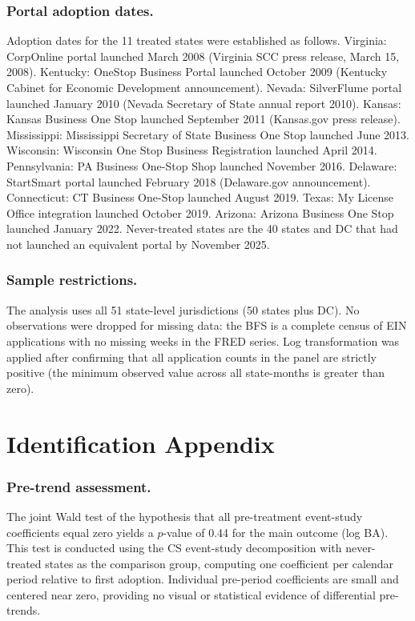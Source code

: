 \documentclass[12pt]{article}
\begin{document}
\subsubsection*{Portal adoption dates.}
Adoption dates for the 11 treated states were established as follows. Virginia: CorpOnline portal launched March 2008 (Virginia SCC press release, March 15, 2008). Kentucky: OneStop Business Portal launched October 2009 (Kentucky Cabinet for Economic Development announcement). Nevada: SilverFlume portal launched January 2010 (Nevada Secretary of State annual report 2010). Kansas: Kansas Business One Stop launched September 2011 (Kansas.gov press release). Mississippi: Mississippi Secretary of State Business One Stop launched June 2013. Wisconsin: Wisconsin One Stop Business Registration launched April 2014. Pennsylvania: PA Business One-Stop Shop launched November 2016. Delaware: StartSmart portal launched February 2018 (Delaware.gov announcement). Connecticut: CT Business One-Stop launched August 2019. Texas: My License Office integration launched October 2019. Arizona: Arizona Business One Stop launched January 2022. Never-treated states are the 40 states and DC that had not launched an equivalent portal by November 2025.

\subsubsection*{Sample restrictions.}
The analysis uses all 51 state-level jurisdictions (50 states plus DC). No observations were dropped for missing data: the BFS is a complete census of EIN applications with no missing weeks in the FRED series. Log transformation was applied after confirming that all application counts in the panel are strictly positive (the minimum observed value across all state-months is greater than zero).

\section{Identification Appendix}
\label{sec:id_appendix}

\subsubsection*{Pre-trend assessment.}
The joint Wald test of the hypothesis that all pre-treatment event-study coefficients equal zero yields a $p$-value of 0.44 for the main outcome (log BA). This test is conducted using the CS event-study decomposition with never-treated states as the comparison group, computing one coefficient per calendar period relative to first adoption. Individual pre-period coefficients are small and centered near zero, providing no visual or statistical evidence of differential pre-trends.
\end{document}
